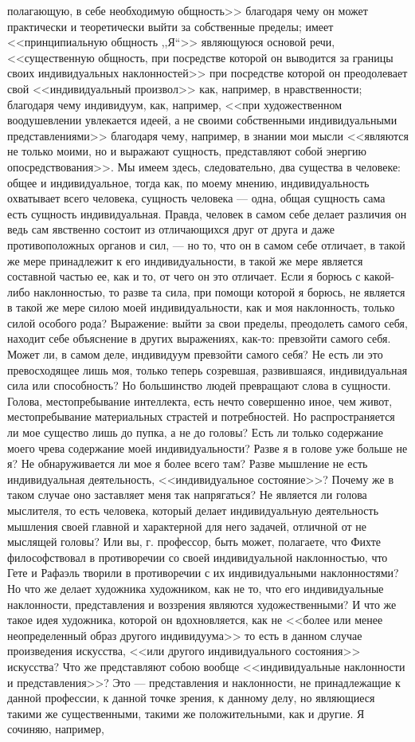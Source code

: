 \documentclass[12pt]{article}
\begin{document}
полагающую, в себе необходимую общность>>  благодаря чему он может практически и теоретически выйти за собственные пределы; имеет <<принципиальную общность ,,Я``>>  являющуюся основой речи, <<существенную общность, при посредстве которой он выводится за границы своих индивидуальных наклонностей>>  при посредстве которой он преодолевает свой <<индивидуальный произвол>>  как, например, в нравственности; благодаря чему индивидуум, как, например, <<при художественном воодушевлении увлекается идеей, а не своими собственными индивидуальными представлениями>>  благодаря чему, например, в знании мои мысли <<являются не только моими, но и выражают сущность, представляют собой энергию опосредствования>>. Мы имеем здесь, следовательно, два существа в человеке: общее и индивидуальное, тогда как, по моему мнению, индивидуальность охватывает всего человека, сущность человека --- одна, общая сущность сама есть сущность индивидуальная. Правда, человек в самом себе делает различия он ведь сам явственно состоит из отличающихся друг от друга и даже противоположных органов и сил, --- но то, что он в самом себе отличает, в такой же мере принадлежит к его индивидуальности, в такой же мере является составной частью ее, как и то, от чего он это отличает. Если я борюсь с какой-либо наклонностью, то разве та сила, при помощи которой я борюсь, не является в такой же мере силою моей индивидуальности, как и моя наклонность, только силой особого рода? Выражение: выйти за свои пределы, преодолеть самого себя, находит себе объяснение в других выражениях, как-то: превзойти самого себя. Может ли, в самом деле, индивидуум превзойти самого себя? Не есть ли это превосходящее лишь моя, только теперь созревшая, развившаяся, индивидуальная сила или способность? Но большинство людей превращают слова в сущности. Голова, местопребывание интеллекта, есть нечто совершенно иное, чем живот, местопребывание материальных страстей и потребностей. Но распространяется ли мое существо лишь до пупка, а не до головы? Есть ли только содержание моего чрева содержание моей индивидуальности? Разве я в голове уже больше не я? Не обнаруживается ли мое я более всего там? Разве мышление не есть индивидуальная деятельность, <<индивидуальное состояние>>? Почему же в таком случае оно заставляет меня так напрягаться? Не является ли голова мыслителя, то есть человека, который делает индивидуальную деятельность мышления своей главной и характерной для него задачей, отличной от не мыслящей головы? Или вы, г. профессор, быть может, полагаете, что Фихте философствовал в противоречии со своей индивидуальной наклонностью, что Гете и Рафаэль творили в противоречии с их индивидуальными наклонностями? Но что же делает художника художником, как не то, что его индивидуальные наклонности, представления и воззрения являются художественными? И что же такое идея художника, которой он вдохновляется, как не <<более или менее неопределенный образ другого индивидуума>>  то есть в данном случае произведения искусства, <<или другого индивидуального состояния>> искусства? Что же представляют собою вообще <<индивидуальные наклонности и представления>>? Это --- представления и наклонности, не принадлежащие к данной профессии, к данной точке зрения, к данному делу, но являющиеся такими же существенными, такими же положительными, как и другие. Я сочиняю, например, 
\end{document}
